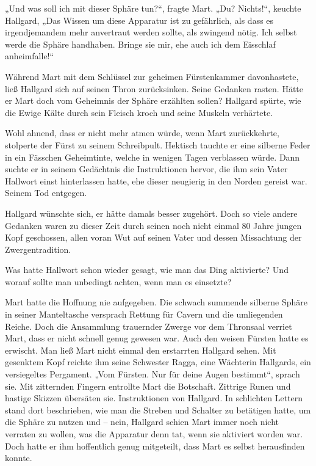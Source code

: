 \documentclass[10pt, a4paper, oneside]{book}
\begin{document}
„Und was soll ich mit dieser Sphäre tun?“, fragte Mart. „Du? Nichts!“, keuchte Hallgard, „Das Wissen um diese Apparatur ist zu gefährlich, als dass es irgendjemandem mehr anvertraut werden sollte, als zwingend nötig. Ich selbst werde die Sphäre handhaben. Bringe sie mir, ehe auch ich dem Eisschlaf anheimfalle!“ \bigskip

Während Mart mit dem Schlüssel zur geheimen Fürstenkammer davonhastete, ließ Hallgard sich auf seinen Thron zurücksinken. Seine Gedanken rasten. Hätte er Mart doch vom Geheimnis der Sphäre erzählten sollen? Hallgard spürte, wie die Ewige Kälte durch sein Fleisch kroch und seine Muskeln verhärtete.

Wohl ahnend, dass er nicht mehr atmen würde, wenn Mart zurückkehrte, stolperte der Fürst zu seinem Schreibpult. Hektisch tauchte er eine silberne Feder in ein Fässchen Geheimtinte, welche in wenigen Tagen verblassen würde. Dann suchte er in seinem Gedächtnis die Instruktionen hervor, die ihm sein Vater Hallwort einst hinterlassen hatte, ehe dieser neugierig in den Norden gereist war. Seinem Tod entgegen.

Hallgard wünschte sich, er hätte damals besser zugehört. Doch so viele andere Gedanken waren zu dieser Zeit durch seinen noch nicht einmal 80 Jahre jungen Kopf geschossen, allen voran Wut auf seinen Vater und dessen Missachtung der Zwergentradition.

Was hatte Hallwort schon wieder gesagt, wie man das Ding aktivierte? Und worauf sollte man unbedingt achten, wenn man es einsetzte? \bigskip

Mart hatte die Hoffnung nie aufgegeben. Die schwach summende silberne Sphäre in seiner Manteltasche versprach Rettung für Cavern und die umliegenden Reiche. Doch die Ansammlung trauernder Zwerge vor dem Thronsaal verriet Mart, dass er nicht schnell genug gewesen war. Auch den weisen Fürsten hatte es erwischt. Man ließ Mart nicht einmal den erstarrten Hallgard sehen. Mit gesenktem Kopf reichte ihm seine Schwester Ragga, eine Wächterin Hallgards, ein versiegeltes Pergament. „Vom Fürsten. Nur für deine Augen bestimmt“, sprach sie. Mit zitternden Fingern entrollte Mart die Botschaft. Zittrige Runen und hastige Skizzen übersäten sie. Instruktionen von Hallgard. In schlichten Lettern stand dort beschrieben, wie man die Streben und Schalter zu betätigen hatte, um die Sphäre zu nutzen und – nein, Hallgard schien Mart immer noch nicht verraten zu wollen, was die Apparatur denn tat, wenn sie aktiviert worden war. Doch hatte er ihm hoffentlich genug mitgeteilt, dass Mart es selbst herausfinden konnte. 
\end{document}
